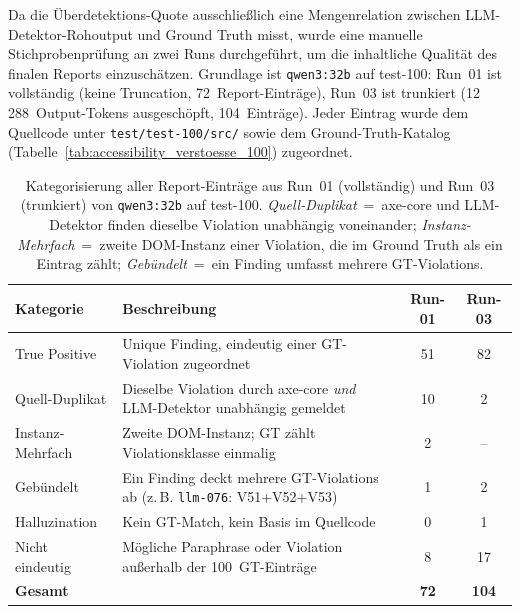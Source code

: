 \clearpage

\label{app:stichprobe_plausibilitaet}

\noindent Da die Überdetektions-Quote ausschließlich eine Mengenrelation zwischen \ac{LLM}-Detektor-Rohoutput und Ground Truth misst, wurde eine manuelle Stichprobenprüfung an zwei Runs durchgeführt, um die inhaltliche Qualität des finalen Reports einzuschätzen. Grundlage ist \texttt{qwen3:32b} auf test-100: Run~01 ist vollständig (keine Truncation, 72~Report-Einträge), Run~03 ist trunkiert (12\,288~Output-Tokens ausgeschöpft, 104~Einträge). Jeder Eintrag wurde dem Quellcode unter \texttt{test/test-100/src/} sowie dem Ground-Truth-Katalog (Tabelle~\ref{tab:accessibility_verstoesse_100}) zugeordnet.

\begin{table}[htbp]
\centering
\setlength{\tabcolsep}{5pt}
\renewcommand{\arraystretch}{1.3}
\caption[Stichproben-Plausibilisierung des finalen Reports]{Kategorisierung aller Report-Einträge aus Run~01 (vollständig) und Run~03 (trunkiert) von \texttt{qwen3:32b} auf test-100. \textit{Quell-Duplikat}~=~axe-core und \ac{LLM}-Detektor finden dieselbe Violation unabhängig voneinander; \textit{Instanz-Mehrfach}~=~zweite \ac{DOM}-Instanz einer Violation, die im Ground Truth als ein Eintrag zählt; \textit{Gebündelt}~=~ein Finding umfasst mehrere GT-Violations.}
\begin{tabular}{@{}lp{6.5cm}cc@{}}
\toprule
\textbf{Kategorie} & \textbf{Beschreibung} & \textbf{Run-01} & \textbf{Run-03} \\
\midrule
True Positive      & Unique Finding, eindeutig einer GT-Violation zugeordnet   & 51 & 82 \\
Quell-Duplikat     & Dieselbe Violation durch axe-core \emph{und} \ac{LLM}-Detektor unabhängig gemeldet & 10 & 2 \\
Instanz-Mehrfach   & Zweite \ac{DOM}-Instanz; GT zählt Violationsklasse einmalig & 2  & -- \\
Gebündelt          & Ein Finding deckt mehrere GT-Violations ab (z.\,B. \texttt{llm-076}: V51+V52+V53) & 1  & 2 \\
Halluzination      & Kein GT-Match, kein Basis im Quellcode                     & 0  & 1 \\
Nicht eindeutig    & Mögliche Paraphrase oder Violation außerhalb der 100~GT-Einträge & 8  & 17 \\
\midrule
\textbf{Gesamt}    &                                                            & \textbf{72} & \textbf{104} \\
\bottomrule
\end{tabular}
\label{tab:stichprobe_plausibilitaet}
\end{table}

